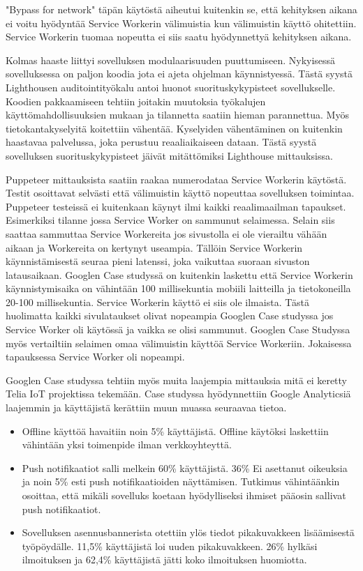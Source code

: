 \documentclass{tktltiki}
\begin{document}
"Bypass for network" täpän käytöstä aiheutui kuitenkin se, että kehityksen aikana ei voitu hyödyntää Service Workerin välimuistia kun välimuistin käyttö ohitettiin. Service Workerin tuomaa nopeutta ei siis saatu hyödynnettyä kehityksen aikana.

Kolmas haaste liittyi sovelluksen modulaarisuuden puuttumiseen. Nykyisessä sovelluksessa on paljon koodia jota ei ajeta ohjelman käynnistyessä. Tästä syystä Lighthousen auditointityökalu antoi huonot suorituskykypisteet sovellukselle. Koodien pakkaamiseen tehtiin joitakin muutoksia työkalujen käyttömahdollisuuksien mukaan ja tilannetta saatiin hieman parannettua. Myös tietokantakyselyitä koitettiin vähentää. Kyselyiden vähentäminen on kuitenkin haastavaa palvelussa, joka perustuu reaaliaikaiseen dataan. Tästä syystä sovelluksen suorituskykypisteet jäivät mitättömiksi Lighthouse mittauksissa. 

Puppeteer mittauksista saatiin raakaa numerodataa Service Workerin käytöstä. Testit osoittavat selvästi että välimuistin käyttö nopeuttaa sovelluksen toimintaa. Puppeteer testeissä ei kuitenkaan käynyt ilmi kaikki reaalimaailman tapaukset. Esimerkiksi tilanne jossa Service Worker on sammunut selaimessa. Selain siis saattaa sammuttaa Service Workereita jos sivustolla ei ole vierailtu vähään aikaan ja Workereita on kertynyt useampia. Tällöin Service Workerin käynnistämisestä seuraa pieni latenssi, joka vaikuttaa suoraan sivuston latausaikaan. Googlen Case studyssä on kuitenkin laskettu että Service Workerin käynnistymisaika on vähintään 100 millisekuntia mobiili laitteilla ja tietokoneilla 20-100 millisekuntia. Service Workerin käyttö ei siis ole ilmaista. Tästä huolimatta kaikki sivulataukset olivat nopeampia Googlen Case studyssa jos Service Worker oli käytössä ja vaikka se olisi sammunut. Googlen Case Studyssa myös vertailtiin selaimen omaa välimuistin käyttöä Service Workeriin. Jokaisessa tapauksessa Service Worker oli nopeampi. 

Googlen Case studyssa tehtiin myös muita laajempia mittauksia mitä ei keretty Telia IoT projektissa tekemään. Case studyssa hyödynnettiin Google Analyticsiä laajemmin ja käyttäjistä kerättiin muun muassa seuraavaa tietoa. 

\begin{itemize}
  \item Offline käyttöä havaitiin noin 5\% käyttäjistä. Offline käytöksi laskettiin vähintään yksi toimenpide ilman verkkoyhteyttä.
  \item Push notifikaatiot salli melkein 60\% käyttäjistä. 36\% Ei asettanut oikeuksia ja noin 5\% esti push notifikaatioiden näyttämisen. Tutkimus vähintäänkin osoittaa, että mikäli sovelluks koetaan hyödylliseksi ihmiset pääosin sallivat push notifikaatiot. 
  \item Sovelluksen asennusbannerista otettiin ylös tiedot pikakuvakkeen lisäämisestä työpöydälle. 11,5\% käyttäjistä loi uuden pikakuvakkeen. 26\% hylkäsi ilmoituksen ja 62,4\% käyttäjistä jätti koko ilmoituksen huomiotta.
\end{itemize}
 
\end{document}
